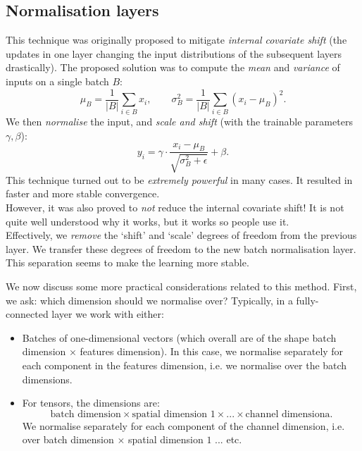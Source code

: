 \subsection{Normalisation layers}
This technique was originally proposed to mitigate \textit{internal covariate shift} (the updates in one layer changing the input distributions of the subsequent layers drastically). The proposed solution was to compute the \textit{mean} and \textit{variance} of inputs on a single batch $B$: 
\begin{equation*}
\mu_B = \frac{1}{|B|} \sum_{i \in B} x_i, \qquad \sigma_B^2 = \frac{1}{|B|} \sum_{i\in B} (x_i - \mu_B)^2.
\end{equation*}
We then \textit{normalise} the input, and \textit{scale and shift} (with the trainable parameters $\gamma, \beta$):
\begin{equation*}
y_i = \gamma \cdot \frac{x_i - \mu_B}{\sqrt{\sigma_B^2 + \epsilon}} + \beta.
\end{equation*}
This technique turned out to be \textit{extremely powerful} in many cases. It resulted in faster and more stable convergence.\\

However, it was also proved to \textit{not} reduce the internal covariate shift! It is not quite well understood why it works, but it works so people use it.\\

Effectively, we \textit{remove} the `shift' and `scale' degrees of freedom from the previous layer. We transfer these degrees of freedom to the new batch normalisation layer. This separation seems to make the learning more stable.

\minirule

We now discuss some more practical considerations related to this method. First, we ask: which dimension should we normalise over? Typically, in a fully-connected layer we work with either:
\begin{itemize}
\item Batches of one-dimensional vectors (which overall are of the shape batch dimension $\times$ features dimension). In this case, we normalise separately for each component in the features dimension, i.e. we normalise over the batch dimensions.
\item For tensors, the dimensions are:
\begin{equation*}
\text{batch dimension} \times \text{spatial dimension $1$} \times ... \times \text{channel dimensiona}.
\end{equation*}
We normalise separately for each component of the channel dimension, i.e. over batch dimension $\times$ spatial dimension $1$ ... etc.
 \end{itemize}
 
